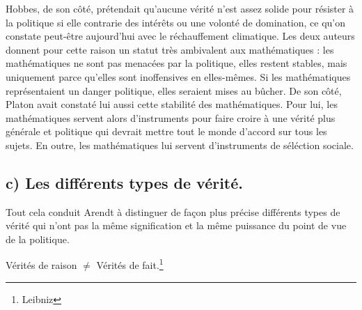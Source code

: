 \documentclass[12pt]{article}
\begin{document}
Hobbes, de son côté, prétendait qu'aucune vérité n'est assez solide pour résister à la politique si elle contrarie des intérêts ou une volonté de domination, ce qu'on constate peut-être aujourd'hui avec le réchauffement climatique.
Les deux auteurs donnent pour cette raison un statut très ambivalent aux mathématiques : les mathématiques ne sont pas menacées par la politique, elles restent stables, mais uniquement parce qu'elles sont inoffensives en elles-mêmes.
Si les mathématiques représentaient un danger politique, elles seraient mises au bûcher.
De son côté, Platon avait constaté lui aussi cette stabilité des mathématiques.
Pour lui, les mathématiques servent alors d'instruments pour faire croire à une vérité plus générale et politique qui devrait mettre tout le monde d'accord sur tous les sujets.
En outre, les mathématiques lui servent d'instruments de séléction sociale.
\subsection*{c) Les différents types de vérité.}
Tout cela conduit Arendt à distinguer de façon plus précise différents types de vérité qui n'ont pas la même signification et la même puissance du point de vue de la politique.

\begin{center}{Vérités de raison $\neq$ Vérités de fait.\footnote{Leibniz}}\end{center}
\end{document}
